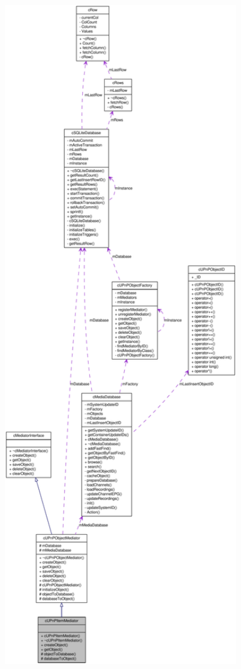 \begin{figure}[H]
\begin{center}
\leavevmode
\includegraphics[width=400pt]{classcUPnPItemMediator__coll__graph}
\end{center}
\end{figure}

